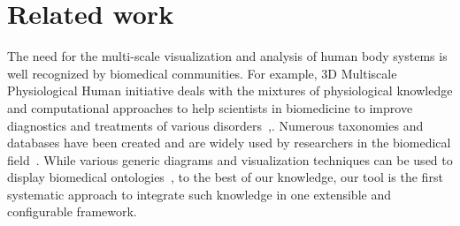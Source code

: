 \section{Related work}
\label{sect:relatedWork}

The need for the multi-scale visualization and analysis of human body systems is well recognized by biomedical communities. For example,
3D Multiscale Physiological Human initiative deals with the mixtures of physiological knowledge and computational approaches to help scientists in biomedicine to improve diagnostics and treatments of various disorders~\cite{MRC09},\cite{Mag09}.
Numerous taxonomies and databases have been created and are widely used by researchers in the biomedical field~\cite{BDB08}.
While various generic diagrams and visualization techniques can be used to display biomedical ontologies~\cite{KHL+07}, to the best of our knowledge, our tool is the first systematic approach to integrate such knowledge in one extensible and configurable framework.

